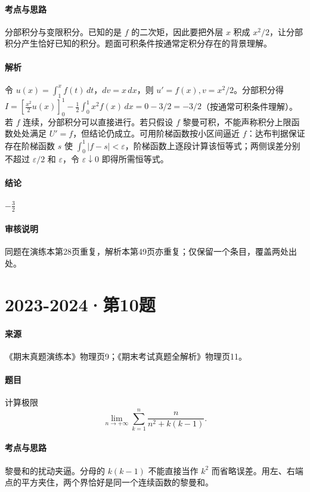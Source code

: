 \documentclass[UTF8,fontset=fandol,12pt,oneside,openany]{ctexrep}
\theoremstyle{definition}
\begin{document}
\paragraph{考点与思路}
分部积分与变限积分。已知的是 $f$ 的二次矩，因此要把外层 $x$ 积成 $x^2/2$，让分部积分产生恰好已知的积分。题面可积条件按通常定积分存在的背景理解。
\paragraph{解析}
令 $u(x)=\int_1^x f(t)\,dt$，$dv=x\,dx$，则 $u'=f(x),v=x^2/2$。分部积分得 $I=[\frac{x^2}2u(x)]_0^1-\frac12\int_0^1x^2f(x)\,dx=0-3/2=-3/2$（按通常可积条件理解）。
若 $f$ 连续，分部积分可以直接进行。若只假设 $f$ 黎曼可积，不能声称积分上限函数处处满足 $U'=f$，但结论仍成立。可用阶梯函数按小区间逼近 $f$：达布判据保证存在阶梯函数 $s$ 使 $\int_0^1|f-s|<\varepsilon$，阶梯函数上逐段计算该恒等式；两侧误差分别不超过 $\varepsilon/2$ 和 $\varepsilon$，令 $\varepsilon\downarrow0$ 即得所需恒等式。
\paragraph{结论}
$-\frac32$
\paragraph{审核说明}
同题在演练本第28页重复，解析本第49页亦重复；仅保留一个条目，覆盖两处出处。

\par\addvspace{18pt}\noindent\begin{minipage}{\linewidth}
\section{2023-2024·第10题}
\label{exam:11:q5}
\paragraph{来源} 《期末真题演练本》物理页9；《期末考试真题全解析》物理页11。
\paragraph{题目}
计算极限 \[\lim_{n\to+\infty}\sum_{k=1}^n\frac{n}{n^2+k(k-1)}.\]
\end{minipage}\par
\paragraph{考点与思路}
黎曼和的扰动夹逼。分母的 $k(k-1)$ 不能直接当作 $k^2$ 而省略误差。用左、右端点的平方夹住，两个界恰好是同一个连续函数的黎曼和。
\end{document}

